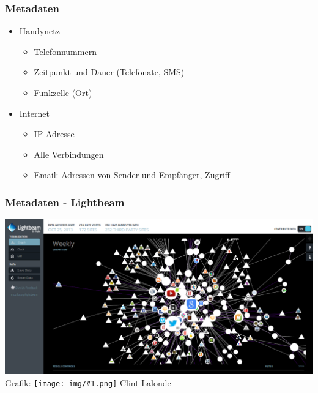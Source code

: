 \documentclass[12pt]{beamer}
\newcommand{\cc}[1]{\texttt{[image: img/\#1.png]}\hspace{1mm}}
\begin{document}
\begin{frame}
  \frametitle{Metadaten}
  \begin{itemize}
    \item Handynetz
      \begin{itemize}
        \item Telefonnummern
        \item Zeitpunkt und Dauer (Telefonate, SMS)
        \item Funkzelle (Ort)
      \end{itemize}
    \item Internet
      \begin{itemize}
        \item IP-Adresse
        \item Alle Verbindungen
        \item Email: Adressen von Sender und Empfänger, Zugriff
      \end{itemize}
  \end{itemize}
\end{frame}

\begin{frame}
    \frametitle{Metadaten - Lightbeam}
    \begin{center}
	\includegraphics[height=0.7\textheight]{img/lightbeam.png}
	\\{\small \href{http://www.flickr.com/photos/8517757@N03/10538205035/in/photolist-h4e4dg}{Grafik:} \href{http://creativecommons.org/licenses/by-sa/3.0/deed.en}{\cc{by-sa}} Clint Lalonde}
    \end{center}
\end{frame}
\end{document}
